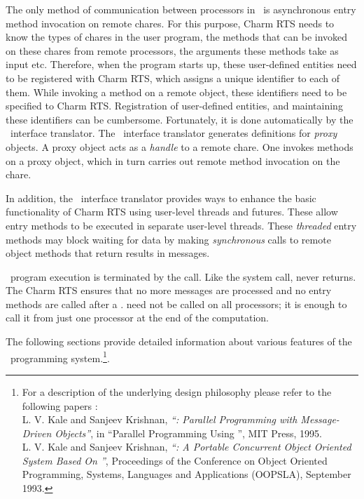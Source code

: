 The only method of communication between processors in \charmpp\ is
asynchronous  entry method invocation on remote chares.
For this purpose, Charm RTS needs to know the types of
chares in the user program, the methods that can be invoked on
these chares from remote processors, the arguments these methods take as
input etc. Therefore, when the program starts up, these user-defined
entities need to be registered with Charm RTS, which assigns a unique
identifier to each of them. While invoking a method on a remote object,
these identifiers need to be specified to Charm RTS. Registration of
user-defined entities, and maintaining these identifiers can be cumbersome.
Fortunately, it is done automatically by the \charmpp\ interface translator.
The \charmpp\ interface translator generates definitions for {\em proxy}
objects. A proxy object acts as a {\em handle} to a remote chare. One
invokes methods on a proxy object, which in turn carries out remote method
invocation on the chare.

In addition, the \charmpp\ interface translator provides ways to enhance the
basic functionality of Charm RTS using user-level threads and futures. These
allow entry methods to be executed in separate user-level threads.  These
 {\em threaded} entry methods may block waiting for data by
making {\em synchronous} calls to remote object methods that return results in
messages.

\charmpp\ program execution is terminated by the  call.  Like the
 system call,  never returns. The Charm RTS ensures
that no more messages are processed and no entry methods are called after a
.  need not be called on all processors; it is enough
to call it from just one processor at the end of the computation.

The following sections provide detailed information about various features of the
\charmpp\ programming system.\footnote{For a description of the underlying design
philosophy please refer to the following papers :\\
    L. V. Kale and Sanjeev Krishnan,
    {\em ``\charmpp : Parallel Programming with Message-Driven Objects''},
    in ``Parallel Programming Using \CC'',
    MIT Press, 1995. \\
    L. V. Kale and Sanjeev Krishnan,
    {\em ``\charmpp : A Portable Concurrent Object Oriented System
    Based On \CC''},
    Proceedings of the Conference on Object Oriented Programming,
    Systems, Languages and Applications (OOPSLA), September 1993.
}.


